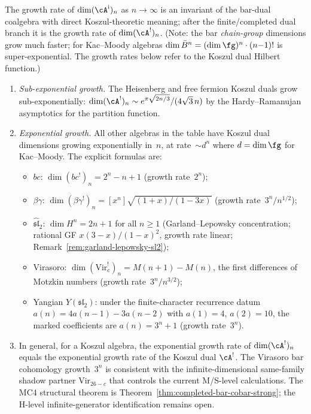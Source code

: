 \begin{remark}\label{rem:bar-growth-koszul}
The growth rate of $\dim(\cA^{\mathrm i})_n$ as $n \to \infty$ is
an invariant of the bar-dual coalgebra with direct Koszul-theoretic
meaning; after the finite/completed dual branch it is the growth rate of
$\dim(\cA^!)_n$.
(Note: the bar \emph{chain-group} dimensions grow much faster;
for Kac--Moody algebras $\dim \bar{B}^n = (\dim\fg)^n \cdot (n{-}1)!$
is super-exponential. The growth rates below refer to
the Koszul dual Hilbert function.)
\begin{enumerate}
\item \emph{Sub-exponential growth.}
 The Heisenberg and free fermion Koszul duals grow
 sub-exponentially: $\dim (\cA^!)_n \sim
 e^{\pi\sqrt{2n/3}}/(4\sqrt{3}\,n)$ by the
 Hardy--Ramanujan asymptotics for the partition function.
\item \emph{Exponential growth.}
 All other algebras in the table have Koszul dual dimensions growing
 exponentially in~$n$, at rate~$\sim d^n$ where $d = \dim\fg$
 for Kac--Moody.
 The explicit formulas are:
 \begin{itemize}
 \item $bc$: $\dim (bc^!)_n = 2^n - n + 1$
 (growth rate~$2^n$);
 \item $\beta\gamma$: $\dim (\beta\gamma^!)_n = [x^n]\sqrt{(1{+}x)/(1{-}3x)}$
 (growth rate~$3^n/n^{1/2}$);
 \item $\widehat{\mathfrak{sl}}_2$:
 $\dim H^n = 2n+1$ for all $n \geq 1$
 (Garland--Lepowsky concentration;
 rational GF $x(3{-}x)/(1{-}x)^2$,
 growth rate linear;
 Remark~\ref{rem:garland-lepowsky-sl2});
 \item Virasoro: $\dim (\mathrm{Vir}_c^!)_n = M(n{+}1) - M(n)$,
 the first differences of Motzkin numbers
 (growth rate~$3^n/n^{3/2}$);
 \item Yangian $Y(\mathfrak{sl}_2)$: under the finite-character
 recurrence datum $a(n)=4a(n{-}1)-3a(n{-}2)$ with
 $a(1)=4$, $a(2)=10$, the marked coefficients are
 $a(n)=3^n+1$ (growth rate~$3^n$).
 \end{itemize}
\item In general, for a Koszul algebra, the exponential
 growth rate of $\dim (\cA^!)_n$ equals the
 exponential growth rate of the Koszul dual $\cA^!$.
 The Virasoro bar cohomology growth~$3^n$ is consistent
 with the infinite-dimensional same-family shadow partner
 $\mathrm{Vir}_{26-c}$ that controls the current M/S-level
 calculations. The MC4 structural theorem is
 Theorem~\ref{thm:completed-bar-cobar-strong}; the H-level
 infinite-generator identification remains open.
\end{enumerate}
\end{remark}

